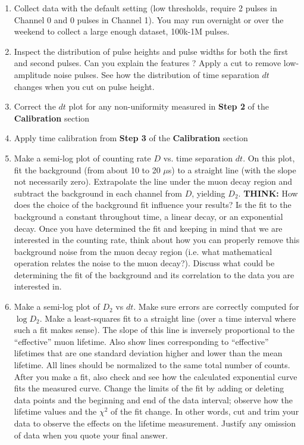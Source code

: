 \documentclass{../lab}
\begin{document}
\begin{enumerate}
    \item Collect data with the default setting (low thresholds, require 2 pulses in Channel 0 and 0 pulses in Channel 1). You may run overnight or over the weekend to collect a large enough dataset, 100k-1M pulses.

    \item Inspect the distribution of pulse heights and pulse widths for both the first and second pulses. Can you explain the features ? Apply a cut to remove low-amplitude noise pulses. See how the distribution of time separation $dt$ changes when you cut on pulse height.

    \item Correct the $dt$ plot for any non-uniformity measured in \textbf{Step 2} of the \textbf{Calibration} section

    \item Apply time calibration from \textbf{Step 3} of the \textbf{Calibration} section

    \item Make a semi-log plot of counting rate $D$ vs. time separation $dt$. On this plot, fit the background (from about 10 to 20 $\mu $s) to a straight line (with the slope not necessarily zero). Extrapolate the line under the muon decay region and subtract the background in each channel from $D$, yielding $D_2$. \textbf{THINK:} How does the choice of the background fit influence your results? Is the fit to the background a constant throughout time, a linear decay, or an exponential decay. Once you have determined the fit and keeping in mind that we are interested in the counting rate, think about how you can properly remove this background noise from the muon decay region (i.e. what mathematical operation relates the noise to the muon decay?). Discuss what could be determining the fit of the background and its correlation to the data you are interested in.

\newpage

    \item Make a semi-log plot of $D_2$ vs $dt$. Make sure errors are correctly computed for $\log D_2$. Make a least-squares fit to a straight line (over a time interval where such a fit makes sense). The slope of this line is inversely proportional to the ``effective'' muon lifetime. Also show lines corresponding to ``effective'' lifetimes that are one standard deviation higher and lower than the mean lifetime. All lines should be normalized to the same total number of counts. After you make a fit, also check and see how the calculated exponential curve fits the measured curve. Change the limits of the fit by adding or deleting data points and the beginning and end of the data interval; observe how the lifetime values and the $\chi^2$ of the fit change. In other words, cut and trim your data to observe the effects on the lifetime measurement. Justify any omission of data when you quote your final answer.


\end{enumerate}
\end{document}
